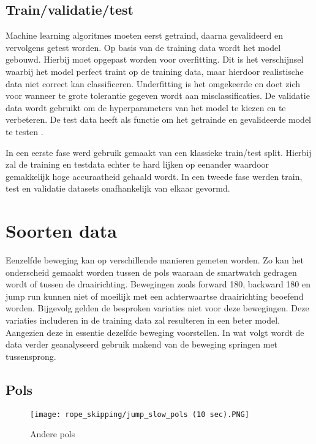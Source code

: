 \subsection{Train/validatie/test} \label{subsectie:train}
Machine learning algoritmes moeten eerst getraind, daarna gevalideerd en vervolgens getest worden. Op basis van de training data wordt het model gebouwd. Hierbij moet opgepast worden voor overfitting. Dit is het verschijnsel waarbij het model perfect traint op de training data, maar hierdoor realistische data niet correct kan classificeren. Underfitting is het omgekeerde en doet zich voor wanneer te grote tolerantie gegeven wordt aan misclassificaties. De validatie data wordt gebruikt om de hyperparameters van het model te kiezen en te verbeteren. De test data heeft als functie om het getrainde en gevalideerde model te testen \cite{ref69}.  

In een eerste fase werd gebruik gemaakt van een klassieke train/test split. Hierbij zal de training en testdata echter te hard lijken op eenander waardoor gemakkelijk hoge accuraatheid gehaald wordt. In een tweede fase werden train, test en validatie datasets onafhankelijk van elkaar gevormd.

\section{Soorten data}
Eenzelfde beweging kan op verschillende manieren gemeten worden. Zo kan het onderscheid gemaakt worden tussen de pols waaraan de smartwatch gedragen wordt of tussen de draairichting. 
Bewegingen zoals forward 180, backward 180 en jump run kunnen niet of moeilijk met een achterwaartse draairichting beoefend worden. Bijgevolg gelden de besproken variaties niet voor deze bewegingen.
Deze variaties includeren in de training data zal resulteren in een beter model. Aangezien deze in essentie dezelfde beweging voorstellen. In wat volgt wordt de data verder geanalyseerd gebruik makend van de beweging springen met tussensprong.

\subsection{Pols}

\begin{figure}[!htpd]
\centering
\caption{Andere pols}\label{fig:anderepols}
\texttt{[image: rope\_skipping/jump\_slow\_pols (10 sec).PNG]}
\end{figure}

